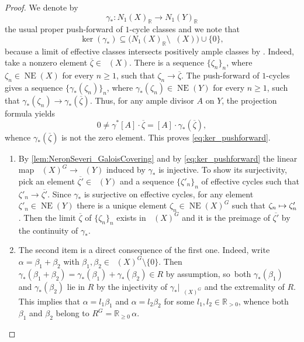 \documentclass[JEP,XML,SOM,Unicode,published]{cedram}
\newcommand\mto{\mathchoice{\longmapsto}{\mapsto}{\mapsto}{\mapsto}}
\theoremstyle{plain}
\theoremstyle{definition}
\newcommand{\R}{\mathbb{R}}
\DeclareMathOperator{\NE}{\mathrm{NE}}
\DeclareMathOperator{\NEb}{\overline{\mathrm{NE}}}
\begin{document}
\begin{proof}
We denote by
\[
\gamma_* \colon N_1(X)_\R \to N_1(Y)_\R
\]
the usual proper push-forward of $1$\nobreakdash-cycle classes and we note that
\begin{equation}
\label{eq:ker_pushforward}
\ker (\gamma_*) \subseteq \bigl(N_1(X)_\R \setminus \NEb(X) \bigr) \cup \{ 0 \},
\end{equation}
because a limit of effective classes intersects positively ample classes by \cite[Th.\,1.44]{KM98}. Indeed, take a nonzero element $\overline{\zeta} \in \NEb(X)$. There is a sequence $\{\zeta_n\}_n$, where $\zeta_n \in \NE(X)$ for every $n \geq 1$, such that $ \zeta_n \to \overline{\zeta}$. The push-forward of $1$\nobreakdash-cycles gives a sequence $\bigl\{ \gamma_*(\zeta_n) \bigr\}_n$, where $\gamma_* (\zeta_n) \in \NE(Y)$ for every $n \geq 1$, such that $\gamma_*(\zeta_n) \to \gamma_*(\overline{\zeta})$. Thus, for any ample divisor $A$ on $Y$, the projection formula yields
\[
0\neq \gamma^*[A]\cdot \overline{\zeta}=[A]\cdot \gamma_*(\overline{\zeta}),
\]
whence $\gamma_*(\overline{\zeta})$ is not the zero element. This proves \eqref{eq:ker_pushforward}.

\begin{enumerate}
\item
By \autoref{lem:NeronSeveri_GaloisCovering} and by \eqref{eq:ker_pushforward} the linear map $\NEb(X)^G\to \NEb(Y)$ induced by $\gamma_*$ is injective. To show its surjectivity, pick an element $\overline{\zeta'} \in \NEb(Y)$ and a sequence $\{\zeta'_n\}_n$ of effective cycles such that $\zeta'_n \to \overline{\zeta'}$. Since $\gamma_*$ is surjective on effective cycles, for any element $\zeta'_n \in \NE(Y)$ there is a unique element $\zeta_n\in \NE(X)^G$ such that $\zeta_n \mto \zeta_n'$.
Then the limit $\overline{\zeta}$ of $\{\zeta_n\}_n$ exists in $\NEb(X)^G$ and it is the preimage of $\overline{\zeta'}$ by the continuity of $\gamma_*$.

\item
The second item is a direct consequence of the first one. Indeed, write $\alpha = \beta_1 + \beta_2$ with $\beta_1, \beta_2 \in \NEb(X)^G \setminus \{0\}$. Then $\gamma_*(\beta_1 + \beta_2)=\gamma_*(\beta_1) + \gamma_*(\beta_2) \in R$ by assumption, so~both $\gamma_*(\beta_1)$ and $ \gamma_*(\beta_2)$ lie in $R$ by the injectivity of $\gamma_* |_{\NEb(X)^G}$ and the extremality of $R$. This implies that $\alpha=l_1 \beta_1$ and $\alpha=l_2 \beta_2$ for some $l_1, l_2 \in \R_{>0}$, whence both $\beta_1$ and $\beta_2$ belong to $R^G = \R_{\geq 0} \,\alpha$.


\end{enumerate}
\end{proof}
\end{document}
